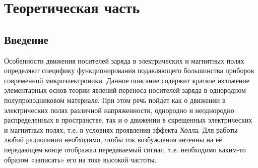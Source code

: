 
\usepackage{gensymb}
\usepackage{textcomp}
\usepackage{mathrsfs}

\def\labauthors{Карусевич А.А, Понур К.А.}
\def\labgroup{430}
\def\department{Кафедра электроники и квантовой физики}
\def\labnumber{1}
\def\labtheme{Движение носителей заряда в электрических и магнитных полях}

\renewcommand{\phi}{\varphi}

\def\E{\mathscr{E}_H}
\def\Rdim{\,\frac{\text{м}^3}{\text{А} \cdot \text{с}}}

\tableofcontents
\newpage
\section{Теоретическая часть}
\subsection*{Введение}
	Особенности движения носителей заряда в электрических и магнитных
полях определяют специфику функционирования подавляющего большинства
приборов современной микроэлектроники. Данное описание содержит краткое
изложение элементарных основ теории явлений переноса носителей заряда в 
однородном полупроводниковом материале. При этом речь пойдет как о движении
в электрических полях различной напряженности, однородно и неоднородно
распределенных в пространстве, так и о движении в скрещенных электрических
и магнитных полях, т.е. в условиях проявления эффекта Холла.
Для работы любой радиолинии необходимо, чтобы ток возбуждения антенны на её передающем конце отображал передаваемый сигнал, т.е. необходимо каким-то образом «записать» его на токе высокой частоты.





